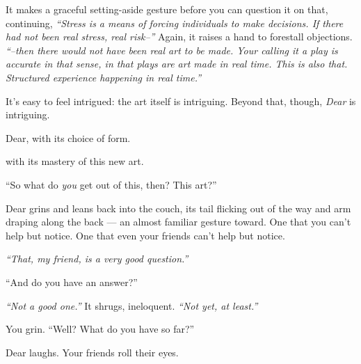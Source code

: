 It makes a graceful setting-aside gesture before you can question it on that, continuing, \emph{``Stress is a means of forcing individuals to make decisions. If there had not been real stress, real risk--''} Again, it raises a hand to forestall objections. \emph{``--then there would not have been real art to be made. Your calling it a play is accurate in that sense, in that plays are art made in real time. This is also that. Structured experience happening in real time.''}

It's easy to feel intrigued: the art itself is intriguing. Beyond that, though, \emph{Dear} is intriguing.

\newpage
\null
\vfill

Dear, with its choice of form.

\phantom{Dear,} {\footnotesize with its mastery of this new art.}

\phantom{Dear, with}{\tiny its casual refusal to conform.}
\vfill

\newpage

\begin{comment}
\newpage

\null
\vfill

Dear, with its choice of form.

\null
\vfill

\newpage

\null
\vfill

Dear with its mastery of this new art.

\null
\vfill

\newpage

Dear with its casual refusal to conform.
\end{comment}

``So what do \emph{you} get out of this, then? This art?''

Dear grins and leans back into the couch, its tail flicking out of the way and arm draping along the back --- an almost familiar gesture toward. One that you can't help but notice. One that even your friends can't help but notice.

\emph{``That, my friend, is a very good question.''}

``And do you have an answer?''

\emph{``Not a good one.''} It shrugs, ineloquent. \emph{``Not yet, at least.''}

You grin. ``Well? What do you have so far?''

Dear laughs. Your friends roll their eyes.

